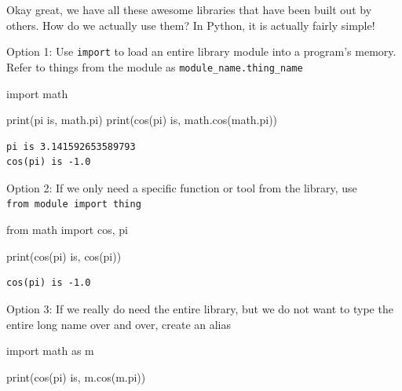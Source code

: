 \documentclass[
  letterpaper,
  DIV=11,
  numbers=noendperiod]{scrreprt}
\newenvironment{Shaded}{\begin{snugshade}}{\end{snugshade}}
\newcommand{\BuiltInTok}[1]{\textcolor[rgb]{0.00,0.23,0.31}{#1}}
\newcommand{\ImportTok}[1]{\textcolor[rgb]{0.00,0.46,0.62}{#1}}
\newcommand{\NormalTok}[1]{\textcolor[rgb]{0.00,0.23,0.31}{#1}}
\newcommand{\StringTok}[1]{\textcolor[rgb]{0.13,0.47,0.30}{#1}}
\begin{document}
Okay great, we have all these awesome libraries that have been built out
by others. How do we actually use them? In Python, it is actually fairly
simple!

Option 1: Use \texttt{import} to load an entire library module into a
program's memory. Refer to things from the module as
\texttt{module\_name.thing\_name}

\begin{Shaded}
\begin{Highlighting}[]
 \ImportTok{import}\NormalTok{ math}

 \BuiltInTok{print}\NormalTok{(}\StringTok{\textquotesingle{}pi is\textquotesingle{}}\NormalTok{, math.pi)}
 \BuiltInTok{print}\NormalTok{(}\StringTok{\textquotesingle{}cos(pi) is\textquotesingle{}}\NormalTok{, math.cos(math.pi))}
\end{Highlighting}
\end{Shaded}

\begin{verbatim}
pi is 3.141592653589793
cos(pi) is -1.0
\end{verbatim}

Option 2: If we only need a specific function or tool from the library,
use \texttt{from\ module\ import\ thing}

\begin{Shaded}
\begin{Highlighting}[]
\ImportTok{from}\NormalTok{ math }\ImportTok{import}\NormalTok{ cos, pi}

\BuiltInTok{print}\NormalTok{(}\StringTok{\textquotesingle{}cos(pi) is\textquotesingle{}}\NormalTok{, cos(pi))}
\end{Highlighting}
\end{Shaded}

\begin{verbatim}
cos(pi) is -1.0
\end{verbatim}

Option 3: If we really do need the entire library, but we do not want to
type the entire long name over and over, create an alias

\begin{Shaded}
\begin{Highlighting}[]
\ImportTok{import}\NormalTok{ math }\ImportTok{as}\NormalTok{ m}

\BuiltInTok{print}\NormalTok{(}\StringTok{\textquotesingle{}cos(pi) is\textquotesingle{}}\NormalTok{, m.cos(m.pi))}
\end{Highlighting}
\end{Shaded}
\end{document}
